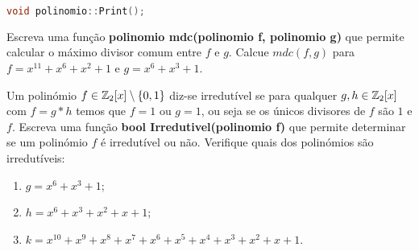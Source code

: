 \begin{enumerate}
\begin{lstlisting}[language=C++]
void polinomio::Print();
\end{lstlisting}
\end{enumerate}

\nextsect
{}

\nextexer{} Escreva uma função {\bf polinomio mdc(polinomio f, polinomio g)} que permite calcular o máximo divisor comum entre $f$ e $g$. Calcue $mdc(f,g)$ para $f=x^{11}+x^6+x^2+1$ e $g=x^6+x^3+1$.

\nextsect
{}

\nextexer{} Um polinómio $f\in \mathbb{Z}_2[x]\setminus \{0,1\}$ diz-se irredutível se para qualquer $g,h\in \mathbb{Z}_2[x]$ com $f=g*h$ temos que $f=1$ ou $g=1$, ou seja se os únicos divisores de $f$ são $1$ e $f$. Escreva uma função {\bf bool Irredutivel(polinomio f)} que permite determinar se um polinómio $f$ é irredutível ou não. Verifique quais dos polinómios são irredutíveis: 
\begin{enumerate}
\item $g=x^6+x^3+1$;
\item $h=x^6+x^3+x^2+x+1$;
\item $k=x^{10}+x^9+x^8+x^7+x^6+x^5+x^4+x^3+x^2+x+1$.
\end{enumerate}









